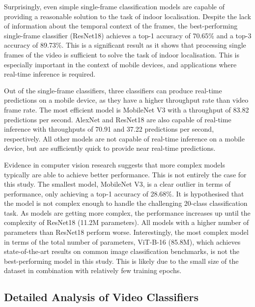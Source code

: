 \documentclass[a4paper]{article}
\begin{document}
Surprisingly, even simple single-frame classification models are capable of
providing a reasonable solution to the task of indoor localisation. Despite
the lack of information about the temporal context of the frames, the
best-performing single-frame classifier (ResNet18) achieves a top-1 accuracy
of 70.65\% and a top-3 accuracy of 89.73\%. This is a significant result as it
shows that processing single frames of the video is sufficient to solve the
task of indoor localisation. This is especially important in the context of
mobile devices, and applications where real-time inference is required.

Out of the single-frame classifiers, three classifiers can produce real-time
predictions on a mobile device, as they have a higher throughput rate than
video frame rate. The most efficient model is MobileNet V3 with a throughput of
83.82 predictions per second. AlexNet and ResNet18 are also capable of
real-time inference with throughputs of 70.91 and 37.22 predictions per
second, respectively. All other models are not capable of real-time inference
on a mobile device, but are sufficiently quick to provide near real-time
predictions.

Evidence in computer vision research suggests that more complex models
typically are able to achieve better performance. This is not entirely the
case for this study. The smallest model, MobileNet V3, is a clear outlier in
terms of performance, only achieving a top-1 accuracy of 28.68\%. It is
hypothesised that the model is not complex enough to handle the challenging
20-class classification task. As models are getting more complex, the
performance increases up until the complexity of ResNet18 (11.2M parameters).
All models with a higher number of parameters than ResNet18 perform worse.
Interestingly, the most complex model in terms of the total number of
parameters, ViT-B-16 (85.8M), which achieves state-of-the-art results on
common image classification benchmarks, is not the best-performing model in
this study. This is likely due to the small size of the dataset in combination
with relatively few training epochs. 


\subsection{Detailed Analysis of Video Classifiers} %
\label{sub:detailed-analysis-of-video-classifiers}
\end{document}
